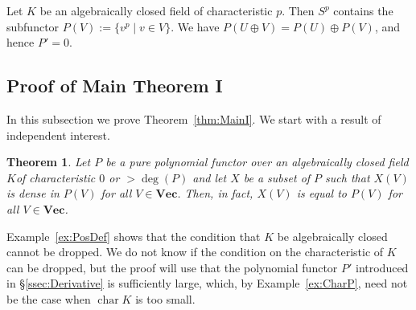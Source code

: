\documentclass{amsart}
\theoremstyle{plain}
\newtheorem{thm}{Theorem}[subsection]
\theoremstyle{definition}
\DeclareMathOperator{\cha}{char}
\renewcommand{\Vec}{\mathbf{Vec}}
\begin{document}
\begin{ex} \label{ex:CharP}
Let $K$ be an algebraically closed field of characteristic $p$. Then
$S^p$ contains the subfunctor $P(V):=\{v^p \mid v \in V\}$.  We have
$P(U \oplus V)=P(U) \oplus P(V)$, and hence $P'=0$.
\end{ex}

\subsection{Proof of Main Theorem I}

In this subsection we prove Theorem~\ref{thm:MainI}.  We start with a
result of independent interest.

\begin{thm} \label{thm:DenseImpliesEqual}
Let $P$ be a pure polynomial functor over an algebraically
closed field $K$of characteristic $0$ or $> \deg(P)$
and let $X$ be a subset of $P$ such that $X(V)$ is dense in $P(V)$
for all $V \in \Vec$. Then, in fact, $X(V)$ is {\em equal} to $P(V)$
for all $V \in \Vec$.
\end{thm}

Example~\ref{ex:PosDef} shows that the condition that $K$ be algebraically
closed cannot be dropped. We do not know if the condition on the
characteristic of $K$ can be dropped, but the proof will use that
the polynomial functor $P'$ introduced in \S\ref{ssec:Derivative} is
sufficiently large, which, by Example~\ref{ex:CharP}, need not be the
case when $\cha K$ is too small.
\end{document}
